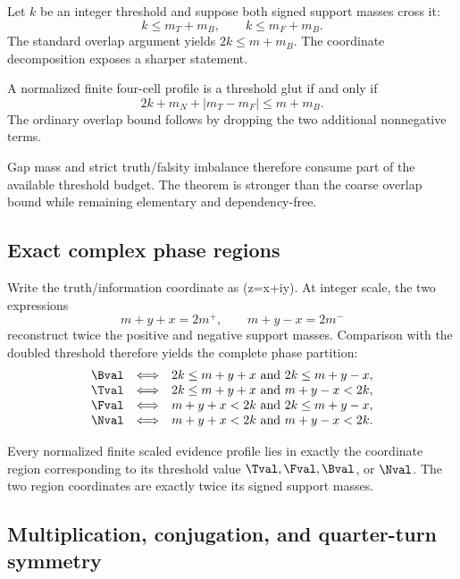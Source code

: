 Let \(k\) be an integer threshold and suppose both signed support masses cross
it:
\[
  k\le m_T+m_B,
  \qquad
  k\le m_F+m_B.
\]
The standard overlap argument yields \(2k\le m+m_B\). The coordinate
decomposition exposes a sharper statement.

\begin{theorem}
A normalized finite four-cell profile is a threshold glut if and only if
\[
  2k+m_N+|m_T-m_F|\le m+m_B.
\]
The ordinary overlap bound follows by dropping the two additional nonnegative
terms.
\statusverified
\end{theorem}

Gap mass and strict truth/falsity imbalance therefore consume part of the
available threshold budget. The theorem is stronger than the coarse overlap
bound while remaining elementary and dependency-free.

\subsection{Exact complex phase regions}

Write the truth/information coordinate as (z=x+iy). At integer scale, the
two expressions
\[
  m+y+x=2m^+,
  \qquad
  m+y-x=2m^-
\]
reconstruct twice the positive and negative support masses. Comparison with
the doubled threshold therefore yields the complete phase partition:
\[
\begin{array}{rcl}
\Bval &\Longleftrightarrow& 2k\le m+y+x\ \text{and}\ 2k\le m+y-x,\\
\Tval &\Longleftrightarrow& 2k\le m+y+x\ \text{and}\ m+y-x<2k,\\
\Fval &\Longleftrightarrow& m+y+x<2k\ \text{and}\ 2k\le m+y-x,\\
\Nval &\Longleftrightarrow& m+y+x<2k\ \text{and}\ m+y-x<2k.
\end{array}
\]

\begin{theorem}
Every normalized finite scaled evidence profile lies in exactly the coordinate
region corresponding to its threshold value \(\Tval,\Fval,\Bval\), or
\(\Nval\). The two region coordinates are exactly twice its signed support
masses.
\statusverified
\end{theorem}

\subsection{Multiplication, conjugation, and quarter-turn symmetry}


